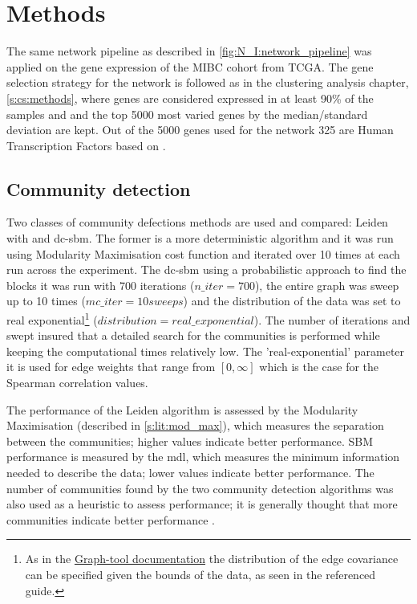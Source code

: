 \section{Methods}


The same network pipeline as described in \cref{fig:N_I:network_pipeline} was applied on the gene expression of the MIBC cohort from TCGA. The gene selection strategy for the network is followed as in the clustering analysis chapter, \cref{s:cs:methods}, where genes are considered expressed in at least 90\% of the samples and and the top 5000 most varied genes by the median/standard deviation are kept. Out of the 5000 genes used for the network 325 are Human Transcription Factors based on \citet{Lambert2018-el}.
 
\subsection*{Community detection} \label{s:N_I:methods_comm_detection}

 Two classes of community defections methods are used and compared: Leiden with  and \acrfull{dc-sbm}. The former is a more deterministic algorithm and it was run using Modularity Maximisation cost function and iterated over 10 times at each run across the experiment. The \acrshort{dc-sbm} using a probabilistic approach to find the blocks it was run with 700 iterations ($n\_iter=700$), the entire graph was sweep up to 10 times ($mc\_iter = 10 sweeps$) and the distribution of the data was set to real exponential\footnote{As in the \href{https://graph-tool.skewed.de/static/doc/demos/inference/inference.html}{Graph-tool documentation} the distribution of the edge covariance can be specified given the bounds of the data, as seen in the referenced guide.} ($distribution = real\_exponential$). The number of iterations and swept insured that a detailed search for the communities is performed while keeping the computational times relatively low. The 'real-exponential' parameter it is used for edge weights that range from $[0, \infty]$ which is the case for the Spearman correlation values.


The performance of the Leiden algorithm is assessed by the Modularity Maximisation (described in \cref{s:lit:mod_max}), which measures the separation between the communities; higher values indicate better performance. SBM performance is measured by the \acrfull{mdl}, which measures the minimum information needed to describe the data; lower values indicate better performance. The number of communities found by the two community detection algorithms was also used as a heuristic to assess performance; it is generally thought that more communities indicate better performance \citep{Care2019-ij}. 

